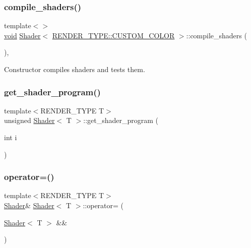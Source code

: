 \subsubsection{\texorpdfstring{compile\+\_\+shaders()}{compile\_shaders()}\hspace{0.1cm}{\footnotesize\ttfamily [3/3]}}
{\footnotesize\ttfamily template$<$$>$ \\
\mbox{\hyperlink{glad_8h_a950fc91edb4504f62f1c577bf4727c29}{void}} \mbox{\hyperlink{classShader}{Shader}}$<$ \mbox{\hyperlink{shader__class_8hpp_a24e288e18eb7b6e01de7565001fedb60a9d34355b5a26c54b5dbab1e45245a6f4}{R\+E\+N\+D\+E\+R\+\_\+\+T\+Y\+P\+E\+::\+C\+U\+S\+T\+O\+M\+\_\+\+C\+O\+L\+OR}} $>$\+::compile\+\_\+shaders (\begin{DoxyParamCaption}{ }\end{DoxyParamCaption})\hspace{0.3cm}{\ttfamily [inline]}, {\ttfamily [protected]}}



Constructor compiles shaders and tests them. 

\mbox{\label{classShader_a2c19b216850480109f9d5f7ed6ab6aa6}} 
\subsubsection{\texorpdfstring{get\+\_\+shader\+\_\+program()}{get\_shader\_program()}}
{\footnotesize\ttfamily template$<$R\+E\+N\+D\+E\+R\+\_\+\+T\+Y\+PE T$>$ \\
unsigned \mbox{\hyperlink{classShader}{Shader}}$<$ T $>$\+::get\+\_\+shader\+\_\+program (\begin{DoxyParamCaption}\item[{int}]{i }\end{DoxyParamCaption})\hspace{0.3cm}{\ttfamily [inline]}}

\mbox{\label{classShader_a3b92fece66095389581a2bf6b3124657}} 
\subsubsection{\texorpdfstring{operator=()}{operator=()}\hspace{0.1cm}{\footnotesize\ttfamily [1/2]}}
{\footnotesize\ttfamily template$<$R\+E\+N\+D\+E\+R\+\_\+\+T\+Y\+PE T$>$ \\
\mbox{\hyperlink{classShader}{Shader}}\& \mbox{\hyperlink{classShader}{Shader}}$<$ T $>$\+::operator= (\begin{DoxyParamCaption}\item[{\mbox{\hyperlink{classShader}{Shader}}$<$ T $>$ \&\&}]{ }\end{DoxyParamCaption})\hspace{0.3cm}{\ttfamily [delete]}}

